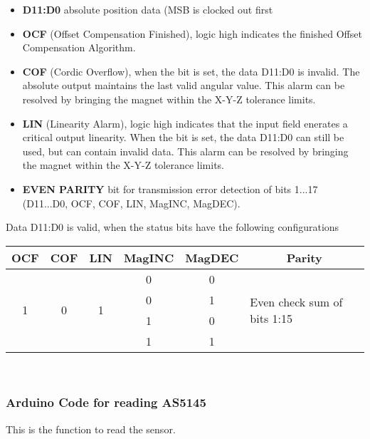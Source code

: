 \begin{itemize}
	\item \textbf{D11:D0} absolute position data (MSB is clocked out first
	\item \textbf{OCF} (Offset Compensation Finished), logic high indicates the finished Offset Compensation Algorithm.
	\item \textbf{COF} (Cordic Overflow), when the bit is set, the data D11:D0 is invalid. The absolute output maintains the last valid angular value. This alarm can be resolved by bringing the magnet within the X-Y-Z tolerance limits.
	\item \textbf{LIN} (Linearity Alarm), logic high indicates that the input field enerates a critical output linearity. When the bit is set, the data D11:D0 can still be used, but can contain invalid data. This alarm can be resolved by bringing the magnet within the X-Y-Z tolerance limits. 
	\item \textbf{EVEN PARITY} bit for transmission error detection of bits 1...17 (D11...D0, OCF, COF, LIN, MagINC, MagDEC).
\end{itemize}

\noindent Data D11:D0 is valid, when the status bits have the following configurations

\begin{center}
	\begin{tabular}{|c|c|c|c|c|p{5cm}|}
	\hline 
	OCF & COF & LIN & MagINC & MagDEC & \multicolumn{1}{c|}{Parity}\\
	\hline
	
	\multirow{4}{*}{1} & \multirow{4}{*}{0} & \multirow{4}{*}{1} & 0 & 0 & \multirow{4}{*}{Even check sum of bits 1:15} \\ \cline{4-5}
	
	 & & & 0 & 1 & \\ \cline{4-5}
	 & & & 1 & 0 & \\ \cline{4-5}
	 & & & 1 & 1 & \\ \hline
	\end{tabular}
\end{center}

\

\subsubsection{Arduino Code for reading AS5145}

This is the function to read the sensor.

